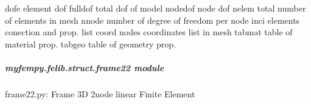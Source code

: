 \documentclass[letterpaper,10pt,english]{sphinxmanual}
\begin{document}
\begin{fulllineitems}
\begin{fulllineitems}
\begin{description}
\sphinxAtStartPar
dofe              \textendash{} element dof
fulldof           \textendash{} total dof of model
nodedof           \textendash{} node dof 
nelem             \textendash{} total number of elements in mesh
nnode             \textendash{} number of degree of freedom per node
inci              \textendash{} elements conection and prop. list
coord             \textendash{} nodes coordinates list in mesh
tabmat            \textendash{} table of material prop.
tabgeo            \textendash{} table of geometry prop.

\end{description}

\end{fulllineitems}


\end{fulllineitems}



\subparagraph{myfempy.felib.struct.frame22 module}
\label{\detokenize{myfempy.felib.struct:module-myfempy.felib.struct.frame22}}\label{\detokenize{myfempy.felib.struct:myfempy-felib-struct-frame22-module}}
\sphinxAtStartPar
frame22.py: Frame 3D 2\sphinxhyphen{}node linear Finite Element
\end{document}
